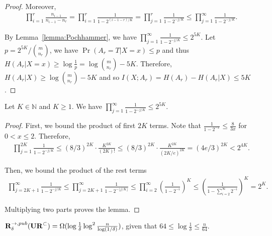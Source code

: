 \begin{proof}
  Moreover, 
  \begin{align}
    \prod_{i=1}^{r} \frac{n_{i-1}}{n_{i-1}-n_r}
    =\prod_{i=1}^{r} \frac{1}{1-2^{(i-1-r)/K}}
    =\prod_{j=1}^{r} \frac{1}{1-2^{-j/K}}
    \le \prod_{j=1}^{\infty} \frac{1}{1-2^{-j/K}}.
  \end{align}
  
  
  By Lemma~\ref{lemma:Pochhammer}, we have $\prod_{j=1}^{\infty} \frac{1}{1-2^{-j/K}}\le 2^{5K}$. Let $p={2^{5K}}/{{m\choose n_r}}$, we have $\Pr(A_r=T|X=x)\le p$ and thus $H(A_r|X=x)\ge \log\frac{1}{p}=\log{{m\choose n_r}}-5K$. Therefore, $H(A_r|X)\ge \log{{m\choose n_r}}-5K$ and so $I(X;A_r)=H(A_r)-H(A_r|X)\le 5K$.  
\end{proof}

\begin{lemma}\label{lemma:Pochhammer}
  Let $K\in \mathbb{N}$ and $K\ge 1$. We have $\prod_{j=1}^{\infty} \frac{1}{1-2^{-j/K}}\le 2^{5K}$.
\end{lemma}

\begin{proof}
  First, we bound the product of first $2K$ terms. Note that $\frac{1}{1-2^{-x}}\le \frac{8}{3x}$ for $0<x\le 2$. Therefore, 
  \begin{align}
    \prod_{j=1}^{2K}\frac{1}{1-2^{-j/K}}
    \le (8/3)^{2K}\cdot \frac{K^{2K}}{(2K)!}
    \le (8/3)^{2K}\cdot \frac{K^{2K}}{(2K/e)^{2K}}
    = (4e/3)^{2K}
    < 2^{4K}. 
  \end{align}
  
  Then, we bound the product of the rest terms
  \begin{align}
    \prod_{j=2K+1}^{\infty}\frac{1}{1-2^{-j/K}} 
    \le \prod_{j=2K+1}^{\infty}\frac{1}{1-2^{-\lfloor j/K \rfloor}} 
    \le \prod_{i=2}^{\infty}\left( \frac{1}{1-2^{-i}}\right)^K 
    \le \left( \frac{1}{1-\sum_{i=2}^{\infty}2^{-i}}\right)^K
    = 2^K.
  \end{align}
  
  Multiplying two parts proves the lemma.
\end{proof}

\begin{theorem}
  $\mathbf{R}^{\rightarrow,pub}_\delta(\mathbf{UR}^\subset) = \Omega(\log \frac{1}{\delta}\log^2 \frac{n}{\log (1/\delta)} )$, given that $64 \le \log \frac{1}{\delta} \le \frac{n}{64}$.
\end{theorem}

